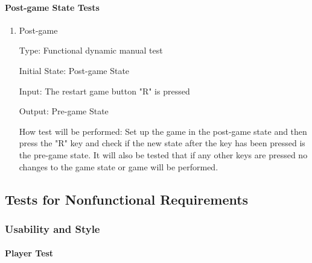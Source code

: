 \documentclass[12pt, titlepage]{article}
\begin{document}
\paragraph{Post-game State Tests}
\begin{enumerate}

\item{Post-game\\}

Type: Functional dynamic manual test

Initial State: Post-game State

Input: The restart game button "R" is pressed

Output: Pre-game State

How test will be performed: Set up the game in the post-game state and then press the "R" key and check if the new state after the key has been pressed is the pre-game state. It will also be tested that if any other keys are pressed no changes to the game state or game will be performed.
\end{enumerate}


\subsection{Tests for Nonfunctional Requirements}

\subsubsection{Usability and Style}

\paragraph{Player Test}
\end{document}
